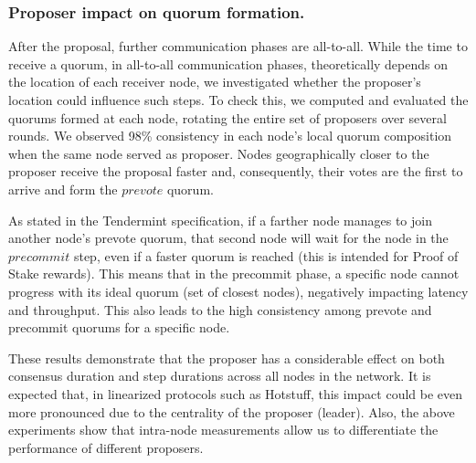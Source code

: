 \subsubsection{Proposer impact on quorum formation.}
After the proposal, further communication phases are all-to-all. 
While the time to receive a quorum, in all-to-all communication phases, theoretically depends on the location of each receiver node, 
we investigated whether the proposer's location could influence such steps.
%
To check this, we computed and evaluated the quorums formed at each node, rotating the entire set of proposers over several rounds.
We observed 98\% consistency in each node's local quorum composition when the same node served as proposer. 
Nodes geographically closer to the proposer receive the proposal faster and, consequently, their votes are the first to arrive and form the $prevote$ quorum.

As stated in the Tendermint specification, if a farther node manages to join another node's prevote quorum, that second node will wait for the node in the $precommit$ step, even if a faster quorum is reached (this is intended for Proof of Stake rewards). This means that in the precommit phase, a specific node cannot progress with its ideal quorum (set of closest nodes), negatively impacting latency and throughput. This also leads to the high consistency among prevote and precommit quorums for a specific node.

These results demonstrate that the proposer has a considerable effect on both consensus duration and step durations across all nodes in the network.
It is expected that, in linearized protocols such as Hotstuff, this impact could be even more pronounced due to the centrality of the proposer (leader).
Also, the above experiments show that intra-node measurements allow us to differentiate the performance of different proposers.
